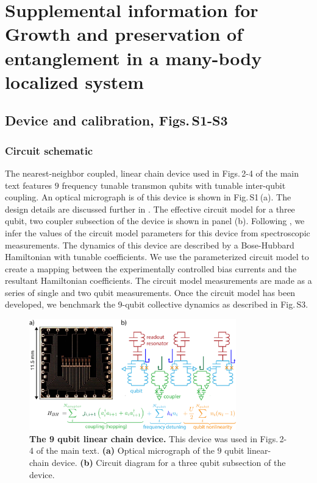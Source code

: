\chapter[Supplemental information for Growth and preservation of entanglement in a many-body localized system]{Supplemental information for Growth and preservation of entanglement in a many-body localized system}

\section{Device and calibration, Figs.\,S1-S3}

\subsection{Circuit schematic}
The nearest-neighbor coupled, linear chain device used in Figs.\,2-4 of the main text features $9$ frequency tunable transmon qubits with tunable inter-qubit coupling.
An optical micrograph is of this device is shown in Fig.\,S1\,(a).
The design details are discussed further in \cite{Neill2018}.
The effective circuit model for a three qubit, two coupler subsection of the device is shown in panel (b).
Following \cite{Neill2018}, we infer the values of the circuit model parameters for this device from spectroscopic measurements.
The dynamics of this device are described by a Bose-Hubbard Hamiltonian with tunable coefficients.
We use the parameterized circuit model to create a mapping between the experimentally controlled bias currents and the resultant Hamiltonian coefficients.
The circuit model measurements are made as a series of single and two qubit measurements.
Once the circuit model has been developed, we benchmark the 9-qubit collective dynamics as described in Fig.\,S3.
\begin{figure}[h]
\centering
\includegraphics[width=0.80\textwidth, keepaspectratio]{./PDF/fs1_190916_1029a.pdf}
\caption{\textbf{The 9 qubit linear chain device.} This device was used in Figs.\,2-4 of the main text.
\textbf{(a)} Optical micrograph of the $9$ qubit linear-chain device.
\textbf{(b)} Circuit diagram for a three qubit subsection of the device.}
\end{figure}

